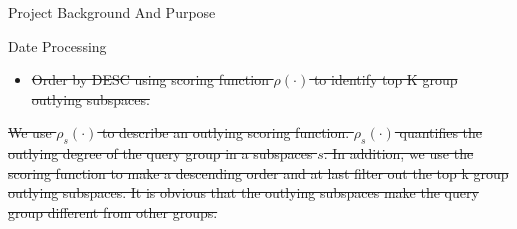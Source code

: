 \documentclass[
 size=14pt,
 paper=smartboard,  %
 mode=present, 		%
 display=slides, 	%
 style=tuliplab,  	%
 pauseslide,
 fleqn,leqno]{powerdot}
\providecommand{\DIFdeltex}[1]{{\protect\color{red}\sout{#1}}}                      %
\providecommand{\DIFdelbegin}{} %
\providecommand{\DIFdelend}{} %
\providecommand{\DIFdel}[1]{\texorpdfstring{\DIFdeltex{#1}}{}} %
\newcommand{\DIFscaledelfig}{0.5}
\newlength{\DIFdelgraphicswidth} %
\newlength{\DIFdelgraphicsheight} %
\newcommand{\DIFdelincludegraphics}[2][]{%
\sbox{\DIFdelgraphicsbox}{\DIFOincludegraphics[#1]{#2}}%
\settoboxwidth{\DIFdelgraphicswidth}{\DIFdelgraphicsbox} %
\settoboxtotalheight{\DIFdelgraphicsheight}{\DIFdelgraphicsbox} %
\scalebox{\DIFscaledelfig}{%
\parbox[b]{\DIFdelgraphicswidth}{\usebox{\DIFdelgraphicsbox}\\[-\baselineskip] \rule{\DIFdelgraphicswidth}{0em}}\llap{\resizebox{\DIFdelgraphicswidth}{\DIFdelgraphicsheight}{%
\setlength{\unitlength}{\DIFdelgraphicswidth}%
\begin{picture}(1,1)%
\thicklines\linethickness{2pt} %
{\color[rgb]{1,0,0}\put(0,0){\framebox(1,1){}}}%
{\color[rgb]{1,0,0}\put(0,0){\line( 1,1){1}}}%
{\color[rgb]{1,0,0}\put(0,1){\line(1,-1){1}}}%
\end{picture}%
}\hspace*{3pt}}} %
} %
\DeclareRobustCommand{\DIFdelbegin}{\DIFOdelbegin \let\includegraphics\DIFdelincludegraphics} %
\DeclareRobustCommand{\DIFdelend}{\DIFOaddend \let\includegraphics\DIFOincludegraphics} %
\begin{document}
\begin{slide}
\begin{slide}{Project Background And Purpose}
\begin{slide}{Date Processing}
\begin{itemize}
\item%
\DIFdel{Order by DESC using scoring function $\rho(\cdot)$
to identify top K group outlying subspaces.
}
\end{itemize}%


\DIFdelend \begin{note}
\DIFdelbegin \DIFdel{We use $\rho_s(\cdot)$ to describe an outlying scoring function.
$\rho_s(\cdot)$ quantifies the outlying degree of the query group in a subspaces $s$.
In addition,
we use the scoring function to make a descending order and at last
filter out the top k group outlying subspaces.
It is obvious that the outlying subspaces make the
query group different from other groups.
}%



\end{note}
\end{slide}
\end{slide}
\end{slide}
\end{document}
